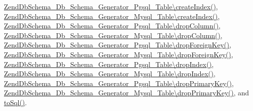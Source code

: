 \hyperlink{Generator_2Pgsql_2Table_8php_source_l00219}{Zend\-Db\-Schema\-\_\-\-Db\-\_\-\-Schema\-\_\-\-Generator\-\_\-\-Pgsql\-\_\-\-Table\textbackslash{}create\-Index()}, \hyperlink{Generator_2Mysql_2Table_8php_source_l00227}{Zend\-Db\-Schema\-\_\-\-Db\-\_\-\-Schema\-\_\-\-Generator\-\_\-\-Mysql\-\_\-\-Table\textbackslash{}create\-Index()}, \hyperlink{Generator_2Pgsql_2Table_8php_source_l00205}{Zend\-Db\-Schema\-\_\-\-Db\-\_\-\-Schema\-\_\-\-Generator\-\_\-\-Pgsql\-\_\-\-Table\textbackslash{}drop\-Column()}, \hyperlink{Generator_2Mysql_2Table_8php_source_l00213}{Zend\-Db\-Schema\-\_\-\-Db\-\_\-\-Schema\-\_\-\-Generator\-\_\-\-Mysql\-\_\-\-Table\textbackslash{}drop\-Column()}, \hyperlink{Generator_2Pgsql_2Table_8php_source_l00351}{Zend\-Db\-Schema\-\_\-\-Db\-\_\-\-Schema\-\_\-\-Generator\-\_\-\-Pgsql\-\_\-\-Table\textbackslash{}drop\-Foreign\-Key()}, \hyperlink{Generator_2Mysql_2Table_8php_source_l00374}{Zend\-Db\-Schema\-\_\-\-Db\-\_\-\-Schema\-\_\-\-Generator\-\_\-\-Mysql\-\_\-\-Table\textbackslash{}drop\-Foreign\-Key()}, \hyperlink{Generator_2Pgsql_2Table_8php_source_l00256}{Zend\-Db\-Schema\-\_\-\-Db\-\_\-\-Schema\-\_\-\-Generator\-\_\-\-Pgsql\-\_\-\-Table\textbackslash{}drop\-Index()}, \hyperlink{Generator_2Mysql_2Table_8php_source_l00264}{Zend\-Db\-Schema\-\_\-\-Db\-\_\-\-Schema\-\_\-\-Generator\-\_\-\-Mysql\-\_\-\-Table\textbackslash{}drop\-Index()}, \hyperlink{Generator_2Pgsql_2Table_8php_source_l00287}{Zend\-Db\-Schema\-\_\-\-Db\-\_\-\-Schema\-\_\-\-Generator\-\_\-\-Pgsql\-\_\-\-Table\textbackslash{}drop\-Primary\-Key()}, \hyperlink{Generator_2Mysql_2Table_8php_source_l00310}{Zend\-Db\-Schema\-\_\-\-Db\-\_\-\-Schema\-\_\-\-Generator\-\_\-\-Mysql\-\_\-\-Table\textbackslash{}drop\-Primary\-Key()}, and \hyperlink{AbstractDefinition_8php_source_l00128}{to\-Sql()}.



